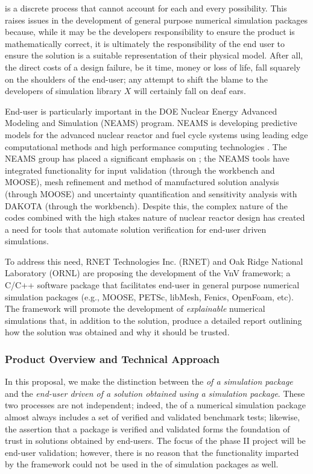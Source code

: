 \VV is a discrete process that cannot account for each and every possibility. This raises issues in the development of general purpose numerical simulation packages because, while it may be the developers responsibility to ensure the product is mathematically correct, it is ultimately the responsibility of the end user to ensure the solution is a suitable representation of their physical model. After all, the direct costs of a design failure, be it time, money or loss of life, fall squarely on the shoulders of the end-user; any attempt to shift the blame to the developers of simulation library $X$ will certainly fall on deaf ears. 

End-user \VV is particularly important in the DOE Nuclear Energy Advanced Modeling and Simulation (NEAMS) program. NEAMS is developing predictive models for the advanced nuclear reactor and fuel cycle systems using leading edge computational methods and high performance computing technologies \cite{NEAMS}. The NEAMS group has placed a significant emphasis on \VV \cite{NEAMSVV}; the NEAMS tools have integrated functionality for input validation (through the workbench and MOOSE), mesh refinement and method of manufactured solution analysis (through MOOSE) and uncertainty quantification and sensitivity analysis with DAKOTA (through the workbench). Despite this, the complex nature of the codes combined with the high stakes nature of nuclear reactor design has created a need for tools that automate solution verification for end-user driven simulations. 

To address this need, RNET Technologies Inc. (RNET) and Oak Ridge National Laboratory (ORNL) are proposing the development of the VnV framework; a C/C++ software package that facilitates end-user \VV in general purpose numerical simulation packages (e.g., MOOSE, PETSc, libMesh, Fenics, OpenFoam, etc). The framework will promote the development of \emph{explainable} numerical simulations that, in addition to the solution, produce a detailed report outlining how the solution was obtained and why it should be trusted. 

\subsubsection{Product Overview and Technical Approach}

In this proposal, we make the distinction between the \emph{\VV of a simulation package} and the \emph{end-user driven \VV of a solution obtained using a simulation package}. These two processes are not independent; indeed, the \VV of a numerical simulation 
package almost always includes a set of verified and validated benchmark tests; likewise, the assertion that a package is verified and validated forms the foundation of trust in solutions obtained by end-users. The focus of the phase II project will be end-user validation; however, there is no reason that the functionality imparted by the framework could not be used in the \VV of simulation packages as well. 

